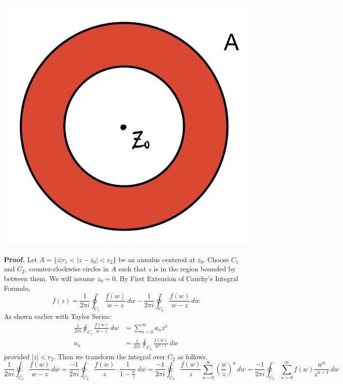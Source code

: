\documentclass[11pt]{article}
\begin{document}
  \begin{minipage}{.5\textwidth}
    \centering
    \includegraphics[scale = 0.2]{19_2}
\end{minipage} 
\newline
\newline
\textbf{Proof.}
Let $A = \{z|r_1 < |z - z_0| < r_2\}$ be an annulus centered at $z_0$. Choose $C_1$ and $C_2$, counter-clockwise circles in $A$ such that $z$ is in the region bounded by between them. We will assume $z_0 = 0$. By First Extension of Cauchy's Integral Formula,
$$f(z) = \frac{1}{2\pi i} \oint_{C_1} \frac{f(w)}{w - z} \,dw - \frac{1}{2\pi i} \oint_{C_2} \frac{f(w)}{w - z} \,dw$$
As shown earlier with Taylor Series: 
\begin{align*}
\frac{1}{2\pi i} \oint_{C_1} \frac{f(w)}{w - z} \,dw &= \sum_{n = 0}^{\infty} a_n z^n \\
a_n &= \frac{1}{2\pi i}\oint_{C_1} \frac{f(w)}{w^{n + 1}} \, dw
\end{align*}
provided $|z| < r_2$.
Then we transform the integral over $C_2$ as follows. 
$$\frac{1}{2\pi i}\oint_{C_2}\frac{f(w)}{w - z} \,dw = \frac{-1}{2\pi i}\oint_{C_2} \frac{f(w)}{z} \cdot \frac{1}{1 - \frac{w}{z}} \, dw = \frac{-1}{2\pi i}\oint_{C_2}\frac{f(w)}{z}\sum_{n = 0}^{\infty} \left(\frac{w}{z}\right)^n \, dw = \frac{-1}{2\pi i}\oint_{C_2}\sum_{n = 0}^{\infty} f(w)\frac{w^n}{z^{n + 1}} \, dw$$
\end{document}
